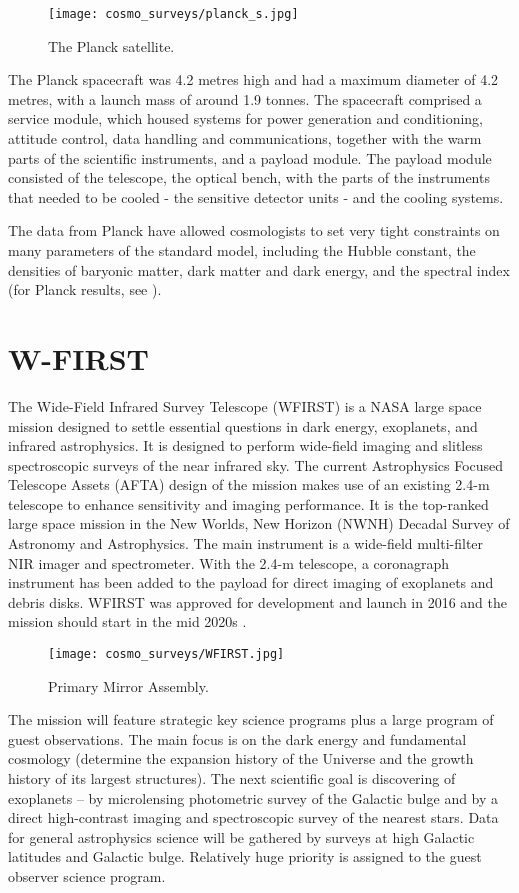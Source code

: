\begin{figure}[ht]
    \centering
    \texttt{[image: cosmo\_surveys/planck\_s.jpg]}
    \caption{The Planck satellite.}
    \label{fig:planck}
\end{figure}
The Planck spacecraft was 4.2 metres high and had a maximum diameter of 4.2 metres, with a launch mass of around 1.9 tonnes. The spacecraft comprised a service module, which housed systems for power generation and conditioning, attitude control, data handling and communications, together with the warm parts of the scientific instruments, and a payload module. The payload module consisted of the telescope, the optical bench, with the parts of the instruments that needed to be cooled - the sensitive detector units - and the cooling systems.

The data from Planck have allowed cosmologists to set very tight constraints on many parameters of the standard model, including the Hubble constant, the densities of baryonic matter, dark matter and dark energy, and the spectral index (for Planck results, see \cite{planck_cosm}).


\section{W-FIRST}
The Wide-Field Infrared Survey Telescope (WFIRST) is a NASA large space mission designed to settle essential questions in dark energy, exoplanets, and infrared astrophysics. It is designed to perform wide-field imaging and slitless spectroscopic surveys of the near infrared sky. The current Astrophysics Focused Telescope Assets (AFTA) design of the mission makes use of an existing 2.4-m telescope to enhance sensitivity and imaging performance. It is the top-ranked large space mission in the New Worlds, New Horizon (NWNH) Decadal Survey of Astronomy and Astrophysics. The main instrument is a wide-field multi-filter NIR imager and spectrometer. With the 2.4-m telescope, a coronagraph instrument has been added to the payload for direct imaging of exoplanets and debris disks. WFIRST was approved for development and launch in 2016 and the mission should start in the mid 2020s \cite{WFIRST_report}.

\begin{figure}[ht]
    \centering
    \texttt{[image: cosmo\_surveys/WFIRST.jpg]}
    \caption{Primary Mirror Assembly.}
    \label{fig:wfirst}
\end{figure}
The mission will feature strategic key science programs plus a large program of guest observations. The main focus is on the dark energy and fundamental cosmology (determine the expansion history of the Universe and the growth history of its largest structures). The next scientific goal is discovering of exoplanets -- by microlensing photometric survey of the Galactic bulge and by a direct high-contrast imaging and spectroscopic survey of the nearest stars. Data for general astrophysics science will be gathered by surveys at high Galactic latitudes and Galactic bulge. Relatively huge priority is assigned to the guest observer science program.

